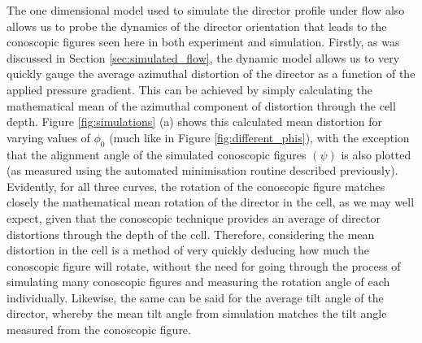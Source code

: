 The one dimensional model used to simulate the director profile under flow also allows us to probe the dynamics of the director orientation that leads to the conoscopic figures seen here in both experiment and simulation. Firstly, as was discussed  in Section \ref{sec:simulated_flow}, the dynamic model allows us to very quickly gauge the average azimuthal distortion of the director as a function of the applied pressure gradient. This can be achieved by simply calculating the mathematical mean of the azimuthal component of distortion through the cell depth. Figure \ref{fig:simulations} (a) shows this calculated mean distortion for varying values of $\phi_0$ (much like in Figure \ref{fig:different_phis}), with the exception that the alignment angle of the simulated conoscopic figures $\left(\psi\right)$ is also plotted (as measured using the automated minimisation routine described previously). Evidently, for all three curves, the rotation of the conoscopic figure matches closely the mathematical mean rotation of the director in the cell, as we may well expect, given that the conoscopic technique provides an average of director distortions through the depth of the cell. Therefore, considering the mean distortion in the cell is a method of very quickly deducing how much the conoscopic figure will rotate, without the need for going through the process of simulating many conoscopic figures and measuring the rotation angle of each individually. Likewise, the same can be said for the average tilt angle of the director, whereby the mean tilt angle from simulation matches the tilt angle measured from the conoscopic figure.

